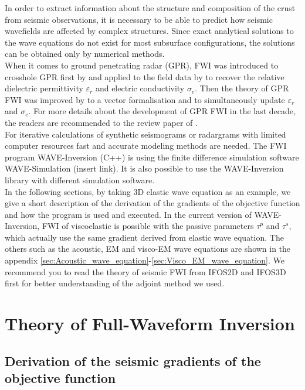 \documentclass[pdftex,a4paper,parskip,listof=totoc,bibliography=totoc,onehalfspacing,12pt]{scrreprt}
\begin{document}
In order to extract information about the structure and composition of the crust from seismic observations, it is necessary to be able to predict how seismic wavefields are affected by complex structures. Since exact analytical
solutions to the wave equations do not exist for most subsurface configurations, the solutions can be obtained only by numerical methods. \\
When it comes to ground penetrating radar (GPR), FWI was introduced to crosshole GPR first by \cite{ernst2007full} and applied to the field data by \cite{ernst2007application} to recover the relative dielectric permittivity $\varepsilon_r$ and electric conductivity $\sigma_e$. Then the theory of GPR FWI was improved by \cite{meles2010new} to a vector formalisation and to simultaneously update  $\varepsilon_r$ and $\sigma_e$. For more details about the development of GPR FWI in the last decade, the readers are recommended to the review paper of \cite{klotzsche2019review}.\\
For iterative calculations of synthetic seismograms or radargrams with limited computer resources fast and accurate modeling methods are needed. The FWI program WAVE-Inversion (C++) is using the finite difference simulation software WAVE-Simulation (insert link). It is also possible to use the WAVE-Inversion library with different simulation software.\\
In the following sections, by taking 3D elastic wave equation as an example, we give a short description of the derivation of the gradients of the objective function and how the program is used and executed. In the current version of WAVE-Inversion, FWI of viscoelastic is possible with the passive parameters $\tau^p$ and $\tau^s$, which actually use the same gradient derived from elastic wave equation. The others such as the acoustic, EM and visco-EM wave equations are shown in the appendix \ref{sec:Acoustic_wave_equation}-\ref{sec:Visco_EM_wave_equation}.
We recommend you to read the theory of seismic FWI from IFOS2D and IFOS3D first for better understanding of the adjoint method we used. 

\cleardoublepage
\part{Theory of Full-Waveform Inversion}

\chapter{Derivation of the seismic gradients of the objective function}
\end{document}
